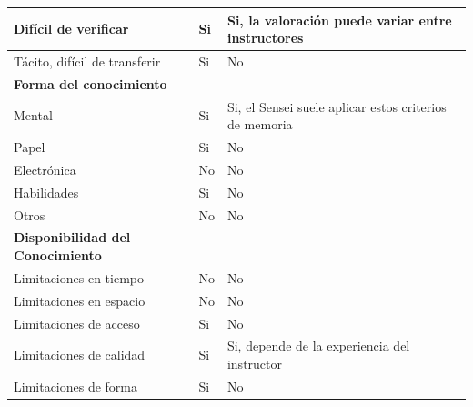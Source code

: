 \documentclass[12pt,a4paper,twoside,spanish]{article}      %
\newcommand{\PreserveBackslash}[1]{\let\temp=\\#1\let\\=\temp}
\let\PBS=\PreserveBackslash
\begin{document}
\begin{table}[H]
\begin{tabularx}{\textwidth}{|p{5cm}|>{\PBS\raggedright}p{0.8cm}|X|}
                Difícil de verificar& Si & Si, la valoración puede variar entre instructores\\ \hline 

                Tácito, difícil de transferir& Si & No \\ \hline 

                \textbf{Forma del conocimiento} & &\\ \hline

                Mental& Si & Si, el Sensei suele aplicar estos criterios de memoria\\ \hline

                Papel& Si & No\\ \hline 

                Electrónica& No  & No\\ \hline

                Habilidades&Si  & No\\ \hline 

                Otros& No & No\\ \hline 

                \textbf{Disponibilidad del Conocimiento} &  &\\ \hline 

                Limitaciones en tiempo& No  & No\\ \hline

                Limitaciones en espacio& No & No \\ \hline 

                Limitaciones de acceso& Si & No \\ \hline 

                Limitaciones de calidad& Si & Si, depende de la experiencia del instructor \\ \hline 

                Limitaciones de forma& Si & No \\ \hline

            \end{tabularx}
            \label{tab.TM2}
        \end{table}
\end{document}
